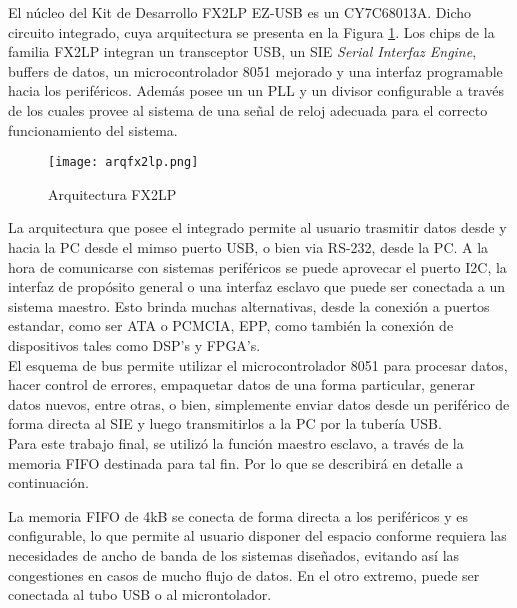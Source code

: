 	El núcleo del Kit de Desarrollo FX2LP EZ-USB es un CY7C68013A. Dicho circuito integrado, cuya arquitectura se presenta en la Figura \ref{arqEzUSB}. Los chips de la familia FX2LP integran un transceptor USB, un SIE {\it Serial Interfaz Engine}, buffers de datos, un microcontrolador 8051 mejorado y una interfaz programable hacia los periféricos. Además posee un un PLL y un divisor configurable a través de los cuales provee al sistema de una señal de reloj adecuada para el correcto funcionamiento del sistema.\\
	
	\begin{figure}[b]
		\centering
		\texttt{[image: arqfx2lp.png]}
		\caption{Arquitectura FX2LP} 
		\label{arqEzUSB}
	\end{figure}

	La arquitectura que posee el integrado permite al usuario trasmitir datos desde y hacia la PC desde el mimso puerto USB, o bien via RS-232, desde la PC. A la hora de comunicarse con sistemas periféricos se puede aprovecar el puerto I2C, la interfaz de propósito general o una interfaz esclavo que puede ser conectada a un sistema maestro. Esto brinda muchas alternativas, desde la conexión a puertos estandar, como ser ATA o PCMCIA, EPP, como también la conexión de dispositivos tales como DSP's y FPGA's.\\
	
	El esquema de bus permite utilizar el microcontrolador 8051 para procesar datos, hacer control de errores, empaquetar datos de una forma particular, generar datos nuevos, entre otras, o bien, simplemente enviar datos desde un periférico de forma directa al SIE y luego transmitirlos a la PC por la tubería USB.\\
	
	Para este trabajo final, se utilizó la función maestro esclavo, a través de la memoria FIFO destinada para tal fin. Por lo que se describirá en detalle a continuación.
	
	La memoria FIFO de 4kB se conecta de forma directa a los periféricos y es configurable, lo que permite al usuario disponer del espacio conforme requiera las necesidades de ancho de banda de los sistemas diseñados, evitando así las congestiones en casos de mucho flujo de datos. En el otro extremo, puede ser conectada al tubo USB o al microntolador.\\ 
	
	